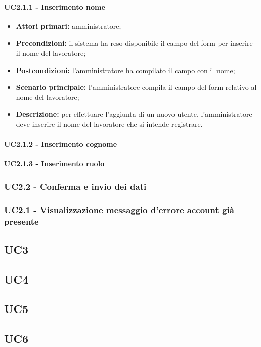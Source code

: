 \paragraph{UC2.1.1 - Inserimento nome}
\begin{itemize}
	\item 	\textbf{Attori primari:} amministratore;
	\item 	\textbf{Precondizioni:} il sistema ha reso disponibile il campo del form per inserire il nome del lavoratore;
	\item 	\textbf{Postcondizioni:} l'amministratore ha compilato il campo con il nome;
	\item 	\textbf{Scenario principale:} l'amministratore compila il campo del form relativo al nome del lavoratore;
	\item 	\textbf{Descrizione:} per effettuare l'aggiunta di un nuovo utente, l'amministratore deve inserire il nome del lavoratore che si intende registrare.

\end{itemize}

\paragraph{UC2.1.2 - Inserimento cognome}
\paragraph{UC2.1.3 - Inserimento ruolo}

\subsubsection{UC2.2 - Conferma e invio dei dati}
\subsubsection{UC2.1 - Visualizzazione messaggio d'errore account già presente}

\subsection{UC3}
\subsection{UC4}
\subsection{UC5}
\subsection{UC6}
